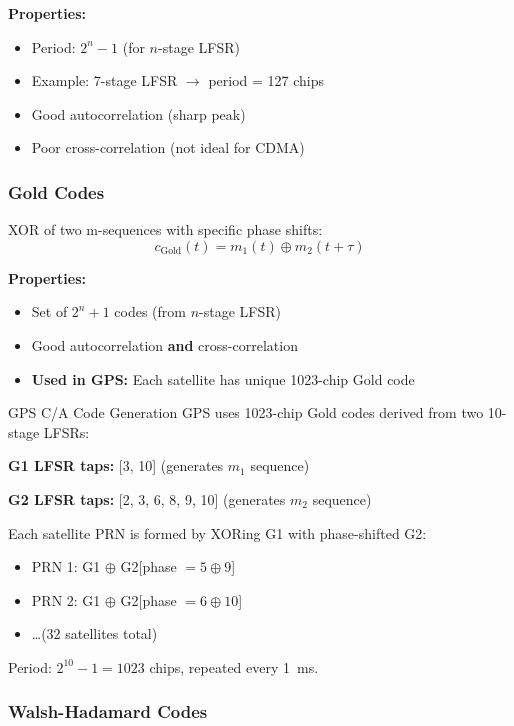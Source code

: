 \textbf{Properties:}
\begin{itemize}
\item Period: $2^n - 1$ (for $n$-stage LFSR)
\item Example: 7-stage LFSR $\rightarrow$ period = 127 chips
\item Good autocorrelation (sharp peak)
\item Poor cross-correlation (not ideal for CDMA)
\end{itemize}

\subsubsection{Gold Codes}

XOR of two m-sequences with specific phase shifts:
\begin{equation}
c_{\mathrm{Gold}}(t) = m_1(t) \oplus m_2(t + \tau)
\end{equation}

\textbf{Properties:}
\begin{itemize}
\item Set of $2^n + 1$ codes (from $n$-stage LFSR)
\item Good autocorrelation \textbf{and} cross-correlation
\item \textbf{Used in GPS:} Each satellite has unique 1023-chip Gold code
\end{itemize}

\begin{calloutbox}[colback=black!5!white,colframe=black]{GPS C/A Code Generation}
GPS uses 1023-chip Gold codes derived from two 10-stage LFSRs:

\textbf{G1 LFSR taps:} [3, 10] (generates $m_1$ sequence)

\textbf{G2 LFSR taps:} [2, 3, 6, 8, 9, 10] (generates $m_2$ sequence)

Each satellite PRN is formed by XORing G1 with phase-shifted G2:
\begin{itemize}
\item PRN 1: G1 $\oplus$ G2[phase $= 5 \oplus 9$]
\item PRN 2: G1 $\oplus$ G2[phase $= 6 \oplus 10$]
\item \ldots (32 satellites total)
\end{itemize}

Period: $2^{10} - 1 = 1023$ chips, repeated every 1~ms.
\end{calloutbox}

\subsubsection{Walsh-Hadamard Codes}

